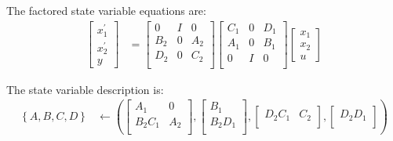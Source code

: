 \documentclass[a4paper,twoside,10pt,english]{report}
\begin{document}
The factored state variable equations are:
\begin{align*}
\left[\begin{array}{c}
x^{\prime}_{1}\\
x^{\prime}_{2}\\
y
\end{array}\right] 
&= 
\left[\begin{array}{ccc}
0 & I & 0\\
B_{2} & 0 & A_{2}\\
D_{2} & 0 & C_{2}\\
\end{array}\right]
\left[\begin{array}{ccc}
C_{1} & 0 & D_{1}\\
A_{1} & 0 & B_{1}\\
0 & I & 0\\
\end{array}\right] 
\left[\begin{array}{c}
x_{1}\\
x_{2}\\
u
\end{array}\right]
\end{align*}

The state variable description is:
\begin{align*}
\left\{A,B,C,D\right\} & \leftarrow  
\left(
\left[\begin{array}{cc}
A_{1} & 0\\
B_{2}C_{1} & A_{2}\\
\end{array}\right],
\left[\begin{array}{c}
B_{1}\\
B_{2}D_{1}\\
\end{array}\right],
\left[\begin{array}{cc}
D_{2}C_{1} & C_{2}\\
\end{array}\right],
\left[\begin{array}{c}
D_{2}D_{1}\\
\end{array}\right]
\right)
\end{align*}
\end{document}
